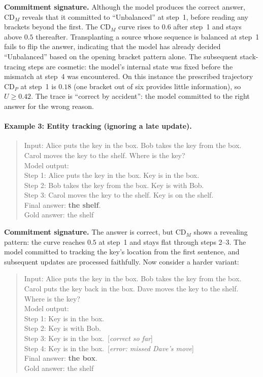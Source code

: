 \documentclass[11pt]{article}
\newcommand{\CDP}{\mathrm{CD}_{P}}
\newcommand{\CDM}{\mathrm{CD}_{M}}
\begin{document}
\noindent\textbf{Commitment signature.} Although the model produces the correct
answer, $\CDM$ reveals that it committed to ``Unbalanced'' at step~1, before
reading any brackets beyond the first. The $\CDM$ curve rises to $0.6$ after
step~1 and stays above $0.5$ thereafter. Transplanting a source whose sequence
is balanced at step~1 fails to flip the answer, indicating that the model has
already decided ``Unbalanced'' based on the opening bracket pattern alone. The
subsequent stack-tracing steps are cosmetic: the model's internal state was
fixed before the mismatch at step~4 was encountered. On this instance the
prescribed trajectory $\CDP$ at step~1 is $0.18$ (one bracket out of six
provides little information), so $U \geq 0.42$. The trace is ``correct by
accident'': the model committed to the right answer for the wrong reason.

\paragraph{Example 3: Entity tracking (ignoring a late update).}

\begin{quote}\small\ttfamily
Input: Alice puts the key in the box. Bob takes the key from
the box. Carol moves the key to the shelf. Where is the key?\\[3pt]
Model output:\\
Step 1: Alice puts the key in the box. Key is in the box.\\
Step 2: Bob takes the key from the box. Key is with Bob.\\
Step 3: Carol moves the key to the shelf. Key is on the shelf.\\
Final answer: \textbf{the shelf}.\\
Gold answer: the shelf
\end{quote}

\noindent\textbf{Commitment signature.} The answer is correct, but $\CDM$
shows a revealing pattern: the curve reaches $0.5$ at step~1 and stays flat
through steps 2--3. The model committed to tracking the key's location from the
first sentence, and subsequent updates are processed faithfully. Now consider a
harder variant:

\begin{quote}\small\ttfamily
Input: Alice puts the key in the box. Bob takes the key from
the box. Carol puts the key back in the box. Dave moves
the key to the shelf. Where is the key?\\[3pt]
Model output:\\
Step 1: Key is in the box.\\
Step 2: Key is with Bob.\\
Step 3: Key is in the box.~\textrm{[\emph{correct so far}]}\\
Step 4: Key is in the box.~\textrm{[\emph{error: missed Dave's move}]}\\
Final answer: \textbf{the box}.\\
Gold answer: the shelf
\end{quote}
\end{document}
